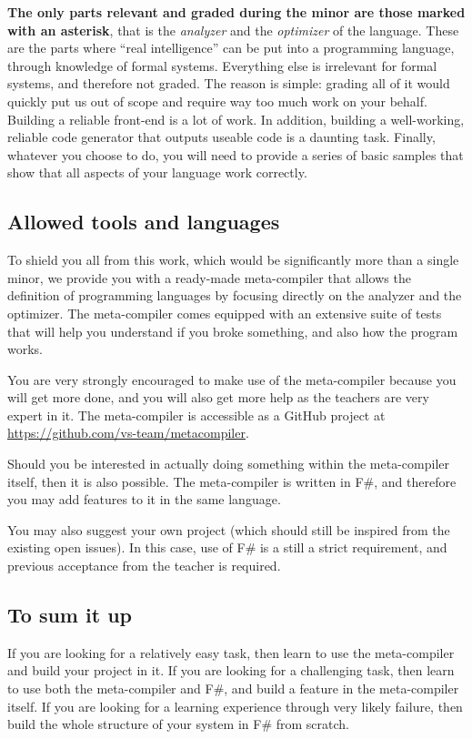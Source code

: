 		\textbf{The only parts relevant and graded during the minor are those marked with an asterisk}, that is the \textit{analyzer} and the \textit{optimizer} of the language. These are the parts where ``real intelligence'' can be put into a programming language, through knowledge of formal systems. Everything else is irrelevant for formal systems, and therefore not graded. The reason is simple: grading all of it would quickly put us out of scope and require way too much work on your behalf. Building a reliable front-end is a lot of work. In addition, building a well-working, reliable code generator that outputs useable code is a daunting task. Finally, whatever you choose to do, you will need to provide a series of basic samples that show that all aspects of your language work correctly. 


	\subsection*{Allowed tools and languages}
		To shield you all from this work, which would be significantly more than a single minor, we provide you with a ready-made meta-compiler that allows the definition of programming languages by focusing directly on the analyzer and the optimizer. The meta-compiler comes equipped with an extensive suite of tests that will help you understand if you broke something, and also how the program works.

		You are very strongly encouraged to make use of the meta-compiler because you will get more done, and you will also get more help as the teachers are very expert in it. The meta-compiler is accessible as a GitHub project at \url{https://github.com/vs-team/metacompiler}.
		
		Should you be interested in actually doing something within the meta-compiler itself, then it is also possible. The meta-compiler is written in F\#, and therefore you may add features to it in the same language.

		You may also suggest your own project (which should still be inspired from the existing open issues). In this case, use of F\# is a still a strict requirement, and previous acceptance from the teacher is required.

	\subsection*{To sum it up}
		If you are looking for a relatively easy task, then learn to use the meta-compiler and build your project in it. If you are looking for a challenging task, then learn to use both the meta-compiler and F\#, and build a feature in the meta-compiler itself. If you are looking for a learning experience through very likely failure, then build the whole structure of your system in F\# from scratch.

